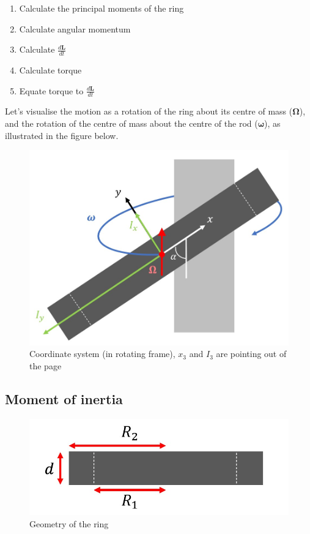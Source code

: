 \documentclass{scrartcl}
\begin{document}
\begin{enumerate}
    \item Calculate the principal moments of the ring
    \item Calculate angular momentum
    \item Calculate $\frac{d\mathbf{L}}{dt}$
    \item Calculate torque
    \item Equate torque  to $\frac{d\mathbf{L}}{dt}$
\end{enumerate}

Let's visualise the motion as a rotation of the ring about its centre of mass ($\mathbf{\Omega}$), and the rotation of the centre of mass about the centre of the rod ($\boldsymbol{\omega}$), as illustrated in the figure below.

\begin{figure}[h]
    \centering
    \includegraphics[scale=0.4]{diagram1.jpg}
    \caption{Coordinate system (in rotating frame), $x_3$ and $I_3$ are pointing out of the page}
    \label{2}

\end{figure}

\subsection{Moment of inertia}
\begin{figure}[h]
    \centering
    \includegraphics[scale=0.5]{diagram2.jpg}
    \caption{Geometry of the ring}
    \label{1}
\end{figure}
\end{document}
